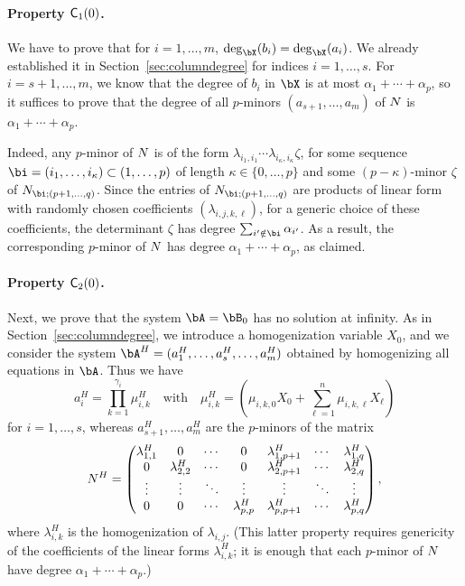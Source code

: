 \documentclass[12pt]{article}
\begin{document}
\paragraph{Property $\mathsf{C}_1(0)$.} We have to prove that for $i=1,\dots,m$,
$\deg_\bX(b_i)=\deg_\bX(a_i)$. We already established it in
Section~\ref{sec:columndegree} for indices $i=1,\dots,s$. For
$i=s+1,\dots,m$, we know that the degree of $b_i$ in $\bX$ is at most
$\alpha_1 + \cdots + \alpha_p$, so it suffices to prove that the
degree of all $p$-minors $(a_{s+1},\dots,a_m)$ of ${N}$ is $\alpha_1 +
\cdots + \alpha_p$.

Indeed, any $p$-minor of ${N}$ is of the form $\lambda_{i_1,i_1}
\cdots \lambda_{i_\kappa,i_\kappa} \zeta$, for some sequence
$\bi=(i_1,\dots,i_\kappa) \subset (1,\dots,p)$ of length $\kappa \in
\{0,\dots,p\}$ and some $(p-\kappa)$-minor $\zeta$ of $\mN_{\bi
  \mathbf{;}(p+1,\dots,q)}$.  Since the entries of $\mN_{\bi
  \mathbf{;}(p+1,\dots,q)}$ are products of linear form with randomly
chosen coefficients $(\lambda_{i,j,k,\ell})$, for a generic choice of
these coefficients, the determinant $\zeta$ has degree
$\sum_{i' \notin \bi} \alpha_{i'}$. As a result, the corresponding
$p$-minor of ${N}$ has degree $\alpha_1 + \cdots + \alpha_p$, as
claimed.

\paragraph{Property $\mathsf{C}_2(0)$.} Next, we prove that the system $\bA=\bB_0$ has no solution 
at infinity. As in Section~\ref{sec:columndegree}, we introduce a homogenization
variable $X_0$, and we consider the system $\bA^H=(a_1^H,\dots,a_s^H,\dots,a_m^H)$ obtained 
by homogenizing all equations in $\bA$. Thus we have
$$a_i^H=\prod_{k=1}^{\gamma_i} \mu^H_{i,k} \quad\text{with}\quad \mu^H_{i,k}=(\mu_{i,k,0}X_0 + \sum_{\ell = 1}^{n}\mu_{i,k,\ell}X_\ell)$$
for $i=1,\dots,s$, whereas $a_{s+1}^H,\dots,a_m^H$ are the $p$-minors of the matrix
\begin{align*}
{N}^H = \left( \begin{matrix}
\lambda^H_{1,1} & 0 & \cdots & 0 & \lambda^H_{1,p+1} & \cdots & \lambda^H_{1, q}\\
0 & \lambda^H_{2,2} & \cdots & 0 & \lambda^H_{2,p+1} & \cdots & \lambda^H_{2, q}\\
\vdots & \vdots & \ddots & \vdots & \vdots & \ddots & \vdots\\
0 & 0 & \cdots & \lambda^H_{p,p} & \lambda^H_{p,p+1} & \cdots & \lambda^H_{p, q}
\end{matrix} \right),  
\end{align*}
where $\lambda^H_{i,k}$ is the homogenization of
$\lambda_{i,j}$. (This latter property requires genericity of the
coefficients of the linear forms $\lambda^H_{i,k}$; it is enough that 
each $p$-minor of ${N}$ have degree $\alpha_1 + \cdots + \alpha_p$.)
\end{document}
